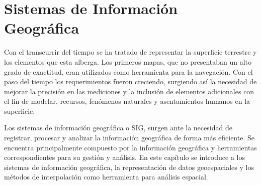 \chapter{Sistemas de Información Geográfica}
Con el transcurrir del tiempo se ha tratado de representar la superficie terrestre y los elementos
que esta alberga. Los primeros mapas, que no presentaban un alto grado de exactitud, eran
utilizados como herramienta para la navegación. Con el paso del tiempo los requerimientos fueron
creciendo, surgiendo así la necesidad de mejorar la precisión en las mediciones y la inclusión de
elementos adicionales con el fin de modelar, recursos, fenómenos naturales y asentamientos humanos
en la superficie.

Los sistemas de información geográfica o SIG, surgen ante la necesidad de registrar, procesar y
analizar la información geográfica de forma más eficiente. Se encuentra principalmente compuesto
por la información geográfica y herramientas correspondientes para su gestión y análisis. En este
capítulo se introduce a los sistemas de información geográfica, la representación de datos
geoespaciales y los métodos de interpolación como herramienta para análisis espacial.








